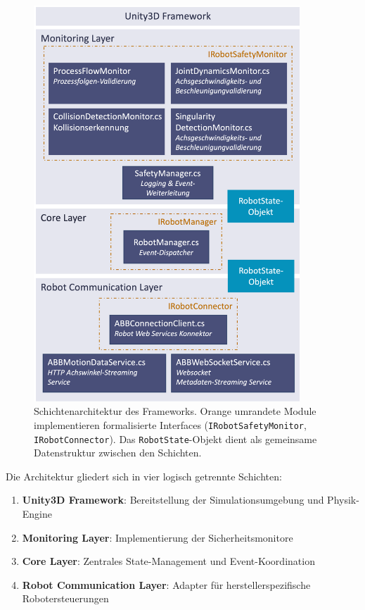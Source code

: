 \begin{figure}[H]
  \centering
  \includegraphics[width=10cm]{figures/LayerArchitekturFramework.png}
  \caption{Schichtenarchitektur des Frameworks. Orange umrandete
    Module implementieren formalisierte Interfaces
    (\texttt{IRobotSafetyMonitor}, \texttt{IRobotConnector}). Das
    \texttt{RobotState}-Objekt dient als gemeinsame Datenstruktur
  zwischen den Schichten.}
  \label{fig:layer_architecture}
\end{figure}

Die Architektur gliedert sich in vier logisch getrennte Schichten:

\begin{enumerate}
  \item \textbf{Unity3D Framework}: Bereitstellung der
    Simulationsumgebung und Physik-Engine
  \item \textbf{Monitoring Layer}: Implementierung der Sicherheitsmonitore
  \item \textbf{Core Layer}: Zentrales State-Management und Event-Koordination
  \item \textbf{Robot Communication Layer}: Adapter für
    herstellerspezifische Robotersteuerungen
\end{enumerate}

